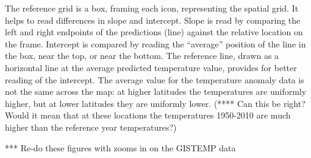 \documentclass[oneside]{article}
\begin{document}
The reference grid is a box, framing each icon, representing the spatial grid. It helps to read differences in slope and intercept. Slope is read by comparing the left and right endpoints of the predictions (line) against the relative location on the frame. Intercept is compared by reading the ``average'' position of the line in the box, near the top, or near the bottom. The reference line, drawn as a horizontal line at the average predicted temperature value, provides for better reading of the intercept. The average value for the temperature anomaly data is not the same across the map: at higher latitudes the temperatures are uniformly higher, but at lower latitudes they are uniformly lower. (**** Can this be right? Would it mean that at these locations the temperatures 1950-2010 are much higher than the reference year temperatures?)



*** Re-do these figures with zooms in on the GISTEMP data
\end{document}
